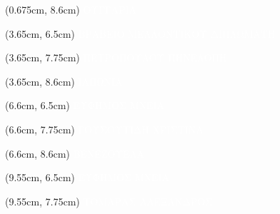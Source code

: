 \documentclass[aspectratio=3219]{beamer}
\begin{document}
{\begin{frame}
\begin{textblock*}{3cm}(0.675cm, 8.6cm)
    \centering
    \textcolor{white}{\tiny ΟΥΓΓΑΡΙΑ \\}
\end{textblock*}

\begin{textblock*}{2.95cm}(3.65cm, 6.5cm)
    \centering
    \textcolor{white}{\scriptsize ΒΡΑΒΕΙΟ ΜΕΛΛΟΝΤΙΚΟΥ ΔΙΠΛΩΜΑΤΗ \\}
\end{textblock*}

\begin{textblock*}{2.95cm}(3.65cm, 7.75cm)
    \centering
    \textcolor{white}{\scriptsize ΠΕΤΡΟΠΟΥΛΟΥ ΠΗΝΕΛΟΠΗ \\}
\end{textblock*}

\begin{textblock*}{2.95cm}(3.65cm, 8.6cm)
    \centering
    \textcolor{white}{\tiny ΙΑΠΩΝΙΑ \\}
\end{textblock*}

\begin{textblock*}{2.95cm}(6.6cm, 6.5cm)
    \centering
    \textcolor{white}{\scriptsize ΕΥΦΗΜΟΣ ΜΝΕΙΑ \\}
\end{textblock*}

\begin{textblock*}{2.95cm}(6.6cm, 7.75cm)
    \centering
    \textcolor{white}{\scriptsize ΓΟΥΣΟΥΤΙΔΗ ΧΡΙΣΤΙΝΑ \\}
\end{textblock*}

\begin{textblock*}{2.95cm}(6.6cm, 8.6cm)
    \centering
    \textcolor{white}{\tiny ΒΕΝΕΖΟΥΕΛΑ \\}
\end{textblock*}

\begin{textblock*}{2.95cm}(9.55cm, 6.5cm)
    \centering
    \textcolor{white}{\scriptsize ΕΥΦΗΜΟΣ ΜΝΕΙΑ \\}
\end{textblock*}

\begin{textblock*}{2.95cm}(9.55cm, 7.75cm)
    \centering
    \textcolor{white}{\scriptsize ΤΟΜΑΡΑΣ ΑΛΕΞΑΝΔΡΟΣ \\}
\end{textblock*}


\end{frame}}
\end{document}
